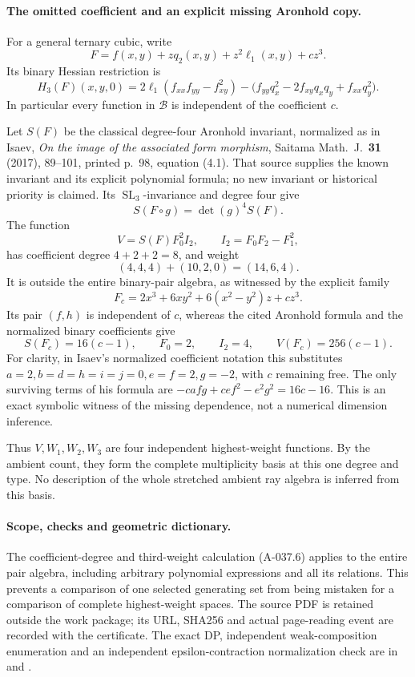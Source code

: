 \paragraph{The omitted coefficient and an explicit missing Aronhold copy.}
For a general ternary cubic, write
\[
                   F=f(x,y)+zq_2(x,y)+z^2\ell_1(x,y)+c z^3.
 \]
Its binary Hessian restriction is
\[
 H_3(F)(x,y,0)
   =2\ell_1(f_{xx}f_{yy}-f_{xy}^2)
       -\bigl(f_{yy}q_x^2-2f_{xy}q_xq_y+f_{xx}q_y^2\bigr).
                                                               \tag{A-037.9}
\]
In particular every function in \(\mathcal B\)
is independent of the coefficient \(c\).

Let \(S(F)\) be the classical degree-four
Aronhold invariant, normalized as in Isaev,
\emph{On the image of the associated form morphism},
Saitama Math.\ J.\ \textbf{31} (2017), 89--101,
printed p.~98, equation (4.1).
That source supplies the known invariant and its
explicit polynomial formula; no new invariant
or historical priority is claimed.
Its \(\operatorname{SL}_3\)-invariance and degree
four give
\[
                         S(F\circ g)=\det(g)^4S(F).
 \]
The function
\[
                            V=S(F)F_0^2 I_2,
       \qquad I_2=F_0F_2-F_1^2,                               \tag{A-037.10}
\]
has coefficient degree \(4+2+2=8\), and weight
\[
                         (4,4,4)+(10,2,0)=(14,6,4).
 \]
It is outside the entire binary-pair algebra,
as witnessed by the explicit family
\[
                  F_c=2x^3+6xy^2+6(x^2-y^2)z+c z^3.
 \]
Its pair \((f,h)\) is independent of \(c\), whereas
the cited Aronhold formula and the normalized
binary coefficients give
\[
        S(F_c)=16(c-1),\qquad F_0=2,\qquad I_2=4,
                    \qquad V(F_c)=256(c-1).                  \tag{A-037.11}
\]
For clarity, in Isaev's normalized coefficient
notation this substitutes
\(a=2,b=d=h=i=j=0,e=f=2,g=-2\), with \(c\)
remaining free. The only surviving terms of his
formula are \(-cafg+cef^2-e^2g^2=16c-16\).
This is an exact symbolic witness of the missing
dependence, not a numerical dimension inference.

Thus \(V,W_1,W_2,W_3\) are four independent
highest-weight functions. By the ambient count,
they form the complete multiplicity basis at
this one degree and type.
No description of the whole stretched ambient
ray algebra is inferred from this basis.

\paragraph{Scope, checks and geometric dictionary.}
The coefficient-degree and third-weight calculation
(A-037.6) applies to the entire pair algebra,
including arbitrary polynomial expressions and
all its relations. This prevents a comparison
of one selected generating set from being mistaken
for a comparison of complete highest-weight spaces.
The source PDF is retained outside the work package;
its URL, SHA256 and actual page-reading event are
recorded with the certificate.
The exact DP, independent weak-composition
enumeration and an independent epsilon-contraction
normalization check are in
 and
.

